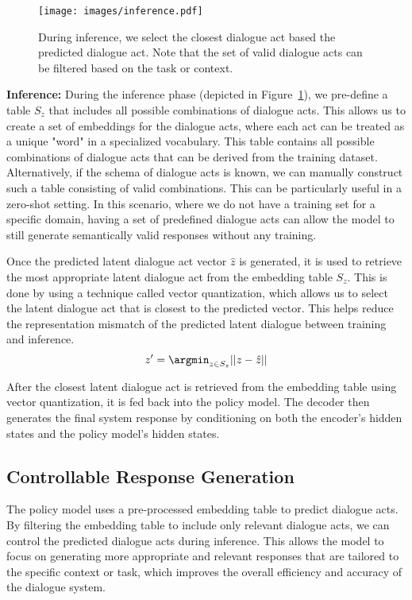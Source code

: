 \begin{figure}[t]
    \centering
    \texttt{[image: images/inference.pdf]}
    \caption{During inference, we select the closest dialogue act based the predicted dialogue act. Note that the set of valid dialogue acts can be filtered based on the task or context.}
    \label{fig:inference}
\end{figure}
\hfill

\textbf{Inference:} During the inference phase (depicted in Figure~\ref{fig:inference}), we pre-define a table $S_z$ that includes all possible combinations of dialogue acts. 
This allows us to create a set of embeddings for the dialogue acts, where each act can be treated as a unique "word" in a specialized vocabulary. 
This table contains all possible combinations of dialogue acts that can be derived from the training dataset. 
Alternatively, if the schema of dialogue acts is known, we can manually construct such a table consisting of valid combinations. 
This can be particularly useful in a zero-shot setting. 
In this scenario, where we do not have a training set for a specific domain, having a set of predefined dialogue acts can allow the model to still generate semantically valid responses without any training.

Once the predicted latent dialogue act vector $\hat{z}$ is generated, it is used to retrieve the most appropriate latent dialogue act from the embedding table $S_z$. 
This is done by using a technique called vector quantization, which allows us to select the latent dialogue act that is closest to the predicted vector. 
This helps reduce the representation mismatch of the predicted latent dialogue between training and inference.
\begin{equation}
    z' = \argmin_{z \in S_z} ||z - \hat{z}||
\end{equation}

After the closest latent dialogue act is retrieved from the embedding table using vector quantization, it is fed back into the policy model. 
The decoder then generates the final system response by conditioning on both the encoder's hidden states and the policy model's hidden states.

\subsection{Controllable Response Generation}

The policy model uses a pre-processed embedding table to predict dialogue acts.
By filtering the embedding table to include only relevant dialogue acts, we can control the predicted dialogue acts during inference. 
This allows the model to focus on generating more appropriate and relevant responses that are tailored to the specific context or task, which improves the overall efficiency and accuracy of the dialogue system. 

